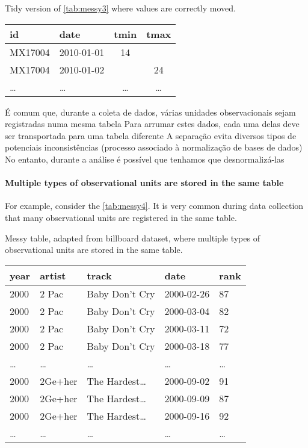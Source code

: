 \begin{tablebox}[label=tab:tidy3b]{Tidy version of \cref{tab:messy3} where values are correctly moved.}
  \centering
  \begin{tabular}{llcc}
    \toprule
    id & date & tmin & tmax \\
    \midrule
    MX17004 & 2010-01-01 & 14 &    \\
    MX17004 & 2010-01-02 &    & 24 \\
    \dots & \dots & \dots & \dots \\
    \bottomrule
  \end{tabular}
\end{tablebox}

É comum que, durante a coleta de dados, várias unidades observacionais sejam registradas
numa mesma tabela Para arrumar estes dados, cada uma delas deve ser transportada para uma
tabela diferente A separação evita diversos tipos de potenciais inconsistências (processo
associado à normalização de bases de dados) No entanto, durante a análise é possível que
tenhamos que desnormalizá-las

\paragraph{Multiple types of observational units are stored in the same table}  For
example, consider the \cref{tab:messy4}.  It is very common during data collection that
many observational units are registered in the same table.

\begin{tablebox}[label=tab:messy4]{Messy table, adapted from billboard dataset, where multiple types of observational units are stored in the same table.}
  \centering
  \begin{tabular}{lllll}
    \toprule
    year & artist & track & date & rank \\
    \midrule
    2000 & 2 Pac & Baby Don't Cry & 2000-02-26 & 87 \\
    2000 & 2 Pac & Baby Don't Cry & 2000-03-04 & 82 \\
    2000 & 2 Pac & Baby Don't Cry & 2000-03-11 & 72 \\
    2000 & 2 Pac & Baby Don't Cry & 2000-03-18 & 77 \\
    \dots & \dots & \dots & \dots & \dots \\
    2000 & 2Ge+her & The Hardest\dots & 2000-09-02 & 91 \\
    2000 & 2Ge+her & The Hardest\dots & 2000-09-09 & 87 \\
    2000 & 2Ge+her & The Hardest\dots & 2000-09-16 & 92 \\
    \dots & \dots & \dots & \dots & \dots \\
    \bottomrule
  \end{tabular}
\end{tablebox}

